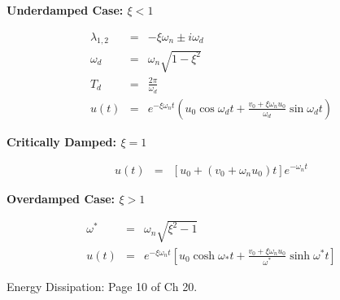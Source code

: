 \documentclass{article}
\begin{document}
\begin{multicols*}{2}
    \textbf{Underdamped Case: $\xi<1$}\par 
    \begin{equation*}
        \begin{array}{lll}
            \lambda_{1,2} & = & -\xi\omega_n\pm i\omega_d\\
            \omega_d & = & \omega_n\sqrt{1-\xi^2}\\
            T_d & = & \frac{2\pi}{\omega_d}\\
            u(t)&=&e^{-\xi\omega_nt}\left(u_0\cos{\omega_dt+\frac{v_0+\xi\omega_nu_0}{\omega_d}\sin{\omega_dt}}\right)
        \end{array}
    \end{equation*}

    \textbf{Critically Damped: $\xi=1$}\par 
    \begin{equation*}
        \begin{array}{lll}
            u(t) & = & [u_0+(v_0+\omega_nu_0)t]e^{-\omega_nt}
        \end{array}
    \end{equation*}

    \textbf{Overdamped Case: $\xi>1$}\par 
    \begin{equation*}
        \begin{array}{lll}
            \omega^* & = & \omega_n\sqrt{\xi^2-1}\\
            u(t) & = & e^{-\xi\omega_nt}\left[u_0\cosh{\omega_*t}+\frac{v_0+\xi\omega_nu_0}{\omega^*}\sinh{\omega^*t}\right]
        \end{array}
    \end{equation*}

    Energy Dissipation: Page 10 of Ch 20.
\end{multicols*}  
\end{document}

